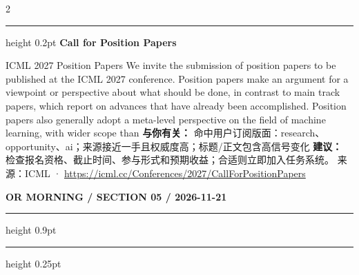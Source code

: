 \documentclass[10.5pt]{ctexart}
\begin{document}
\begin{multicols}{2}
\vspace{2mm}
\hrule height 0.2pt
\vspace{2mm}
{\large\bfseries Call for Position Papers}\par
ICML 2027 Position Papers We invite the submission of position papers to be published at the ICML 2027 conference. Position papers make an argument for a viewpoint or perspective about what should be done, in contrast to main track papers, which report on advances that have already been accomplished. Position papers also generally adopt a meta-level perspective on the field of machine learning, with wider scope than 
\textbf{与你有关：} 命中用户订阅版面：research、opportunity、ai；来源接近一手且权威度高；标题/正文包含高信号变化
\textbf{建议：} 检查报名资格、截止时间、参与形式和预期收益；合适则立即加入任务系统。
{\footnotesize\color{ormuted} 来源：ICML · \url{https://icml.cc/Conferences/2027/CallForPositionPapers}}
\end{multicols}
\newpage
{\small\bfseries OR MORNING / SECTION 05 / 2026-11-21}
\vspace{2mm}
\hrule height 0.9pt
\vspace{1.5mm}
\hrule height 0.25pt
\vspace{4mm}
\end{document}
